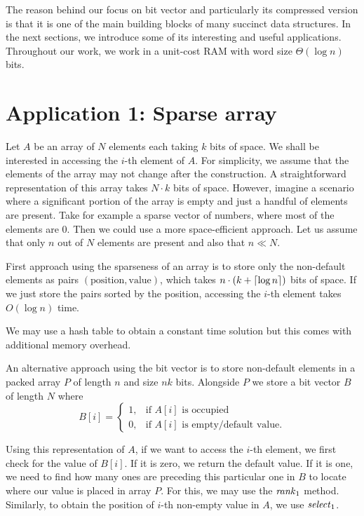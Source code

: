The reason behind our focus on bit vector and particularly its compressed version
is that it is one of the main building blocks of many succinct data structures.
In the next sections, we introduce some of its interesting and useful applications.
Throughout our work, we work in a unit-cost RAM with word size $\Theta(\log n)$ bits.

\section{Application 1: Sparse array}

Let $A$ be an array of $N$ elements each taking $k$ bits of space. We shall be interested in
accessing the $i$-th element of $A$. For simplicity, we assume that the elements of the array may
not change after the construction. A straightforward representation of this array takes $N\cdot k$
bits of space. However, imagine a scenario where a significant portion of the array is empty
and just a handful of elements are present. Take for example a sparse vector of numbers,
where most of the elements are 0. Then we could use a more space-efficient approach.
Let us assume that only $n$ out of $N$ elements are present and also that $n\ll N$.

First approach using the sparseness of an array is to store only the non-default elements as
pairs $(\text{position}, \text{value})$, which takes $n\cdot (k+\left\lceil \log n \right\rceil)$ bits of space.
If we just store the pairs sorted by the position, accessing the $i$-th element takes $O(\log n)$ time.

We may use a hash table to obtain a constant time solution but this comes with additional
memory overhead.

An alternative approach using the bit vector is to store non-default elements in
a packed array $P$ of length $n$ and size $nk$ bits. Alongside $P$ we store a bit vector $B$ of length
$N$ where
\[
   B[i]=
\begin{cases}
   1,& \text{if $A[i]$ is occupied} \\
   0,& \text{if $A[i]$ is empty/default value.}
\end{cases}
\]

Using this representation of $A$, if we want to access the $i$-th element, we first check for
the value of $B[i]$. If it is zero, we return the default value. If it is one, we need to find
how many ones are preceding this particular one in $B$ to locate where our value is placed in
array $P$. For this, we may use the $\mathit{rank}_1$ method. Similarly, to obtain the position of $i$-th
non-empty value in $A$, we use $\mathit{select}_1$.

